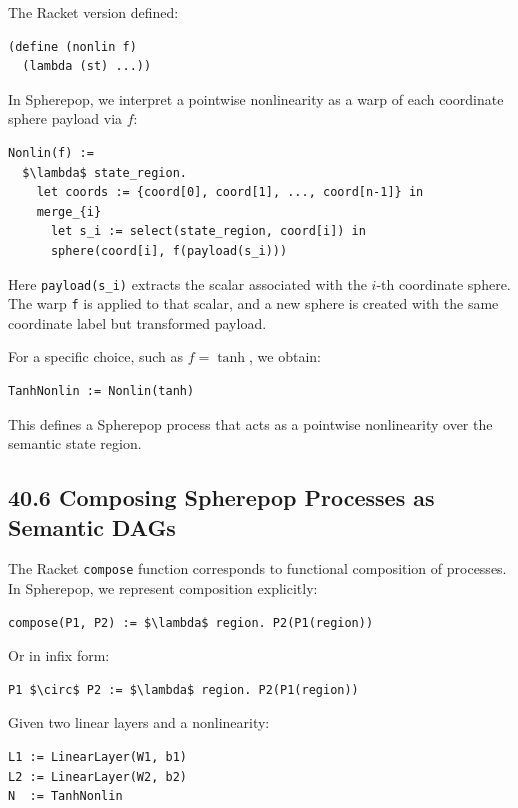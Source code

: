\documentclass[12pt,letterpaper]{article}
\theoremstyle{remark}
\begin{document}
The Racket version defined:

\begin{verbatim}
(define (nonlin f)
  (lambda (st) ...))
\end{verbatim}

In Spherepop, we interpret a pointwise nonlinearity as a warp of each coordinate sphere payload via $f$:

\begin{verbatim}
Nonlin(f) :=
  $\lambda$ state_region.
    let coords := {coord[0], coord[1], ..., coord[n-1]} in
    merge_{i}
      let s_i := select(state_region, coord[i]) in
      sphere(coord[i], f(payload(s_i)))
\end{verbatim}

Here \verb|payload(s_i)| extracts the scalar associated with the $i$-th coordinate sphere. The warp \verb|f| is applied to that scalar, and a new sphere is created with the same coordinate label but transformed payload.

For a specific choice, such as $f = \tanh$, we obtain:

\begin{verbatim}
TanhNonlin := Nonlin(tanh)
\end{verbatim}

This defines a Spherepop process that acts as a pointwise nonlinearity over the semantic state region.

\subsection{40.6 Composing Spherepop Processes as Semantic DAGs}

The Racket \verb|compose| function corresponds to functional composition of processes. In Spherepop, we represent composition explicitly:

\begin{verbatim}
compose(P1, P2) := $\lambda$ region. P2(P1(region))
\end{verbatim}

Or in infix form:

\begin{verbatim}
P1 $\circ$ P2 := $\lambda$ region. P2(P1(region))
\end{verbatim}

Given two linear layers and a nonlinearity:

\begin{verbatim}
L1 := LinearLayer(W1, b1)
L2 := LinearLayer(W2, b2)
N  := TanhNonlin
\end{verbatim}
\end{document}
